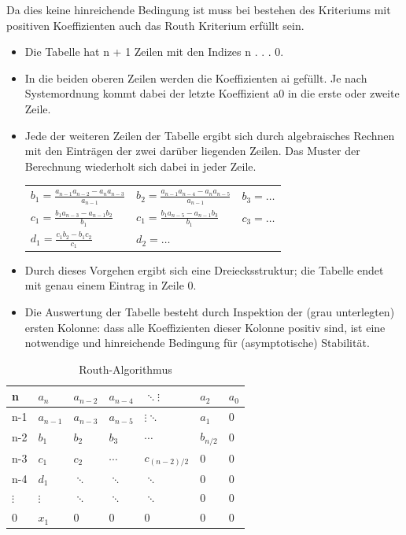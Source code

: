 Da dies keine hinreichende Bedingung ist muss bei bestehen des Kriteriums mit positiven Koeffizienten auch das Routh Kriterium erfüllt sein.
\begin{itemize}
	\item Die Tabelle hat n + 1 Zeilen mit den Indizes n . . . 0.
	\item In die beiden oberen Zeilen werden die Koeffizienten ai gefüllt. Je nach Systemordnung
	kommt dabei der letzte Koeffizient a0 in die erste oder zweite Zeile.
	
	\item {Jede der weiteren Zeilen der Tabelle ergibt sich durch algebraisches Rechnen
	mit den Einträgen der zwei darüber liegenden Zeilen. Das Muster der Berechnung
	wiederholt sich dabei in jeder Zeile.\\
	\begin{tabularx}{\textwidth}{XXX}
	$b_1=\frac{a_{n-1}a_{n-2}-a_{n}a_{n-3}}{a_{n-1}}$
	& $b_2=\frac{a_{n-1}a_{n-4}-a_{n}a_{n-5}}{a_{n-1}}$
	& $b_3=\ldots$ \\
	$c_1=\frac{b_{1}a_{n-3}-a_{n-1}b_{2}}{b_{1}}$
	& $c_1=\frac{b_{1}a_{n-5}-a_{n-1}b_{3}}{b_{1}}$
	& $c_3=\ldots$ \\
	$d_1=\frac{c_{1}b_{2}-b_{1}c_{2}}{c_{1}}$
	& $d_2=\ldots$ & \\
	\end{tabularx}}
	\item Durch dieses Vorgehen ergibt sich eine Dreiecksstruktur; die Tabelle endet mit
	genau einem Eintrag in Zeile 0.
	\item Die Auswertung der Tabelle besteht durch Inspektion der (grau unterlegten)
	ersten Kolonne: dass alle Koeffizienten dieser Kolonne positiv sind, ist eine
	notwendige und hinreichende Bedingung für (asymptotische) Stabilität.
\end{itemize}
\begin{table}
	\begin{tabularx}{0.6\textwidth}{|X||X|X|X|X|X|X|}
	\hline
		n & \cellcolor{hellgrau}$a_n$ & $a_{n-2}$ & $a_{n-4}$ & $\ddots\vdots$ & $a_{2}$  & $a_{0}$ \\ \hline
		n-1 & \cellcolor{hellgrau} $a_{n-1}$ & $a_{n-3}$ & $a_{n-5}$ & $\vdots\ddots$ & $a_{1}$  & 0 \\ \hline\hline
		n-2 & \cellcolor{hellgrau} $b_{1}$ & $b_{2}$ & $b_{3}$ & $\cdots$ & $b_{n/2}$  & 0 \\ \hline
		n-3 & \cellcolor{hellgrau} $c_{1}$ & $c_{2}$ & $\cdots$ & $c_{(n-2)/2}$ & 0 & 0 \\ \hline
		n-4 & \cellcolor{hellgrau} $d_{1}$ & $\ddots$ & $\ddots$ & $\ddots$ & 0 & 0 \\ \hline
		$\vdots$ & \cellcolor{hellgrau} $\vdots$ &  $\ddots$ & $\ddots$ & $\ddots$ & 0 & 0 \\ \hline
		0 & \cellcolor{hellgrau} $x_1$ & 0 & 0 & 0 & 0 & 0 \\ \hline
	\end{tabularx}
\caption{Routh-Algorithmus}
\end{table}



